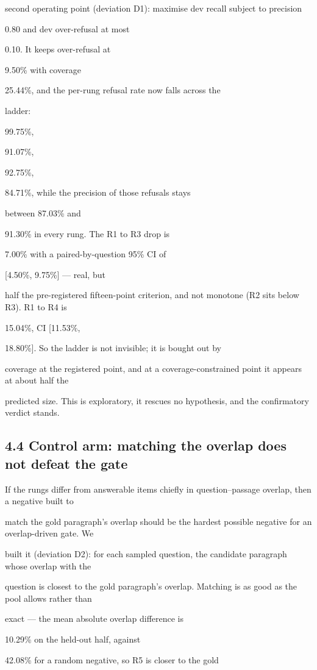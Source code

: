 second operating point (deviation D1): maximise dev recall subject to precision

0.80 and dev over-refusal at most

0.10. It keeps over-refusal at

9.50\% with coverage

25.44\%, and the per-rung refusal rate now falls across the

ladder:

99.75\%,

91.07\%,

92.75\%,

84.71\%, while the precision of those refusals stays

between 87.03\% and

91.30\% in every rung. The R1 to R3 drop is

7.00\% with a paired-by-question 95\% CI of

[4.50\%, 9.75\%] --- real, but

half the pre-registered fifteen-point criterion, and not monotone (R2 sits below R3). R1 to R4 is

15.04\%, CI [11.53\%,

18.80\%]. So the ladder is not invisible; it is bought out by

coverage at the registered point, and at a coverage-constrained point it appears at about half the

predicted size. This is exploratory, it rescues no hypothesis, and the confirmatory verdict stands.

\subsection{4.4 Control arm: matching the overlap does not defeat the gate}
If the rungs differ from answerable items chiefly in question--passage overlap, then a negative built to

match the gold paragraph's overlap should be the hardest possible negative for an overlap-driven gate. We

built it (deviation D2): for each sampled question, the candidate paragraph whose overlap with the

question is closest to the gold paragraph's overlap. Matching is as good as the pool allows rather than

exact --- the mean absolute overlap difference is

10.29\% on the held-out half, against

42.08\% for a random negative, so R5 is closer to the gold

